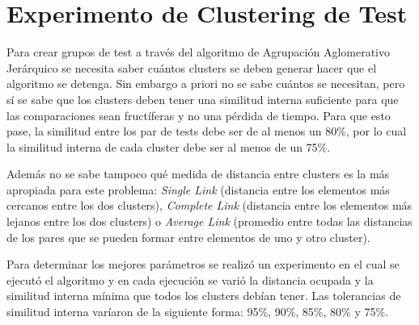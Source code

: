 \chapter{Experimento de Clustering de Test}


\par Para crear grupos de test a través del algoritmo de Agrupación Aglomerativo Jerárquico se necesita saber cuántos clusters se deben generar hacer que el algoritmo se detenga. Sin embargo a priori no se sabe cuántos se necesitan, pero sí se sabe que los clusters deben tener una similitud interna suficiente para que las comparaciones sean fructíferas y no una pérdida de tiempo. Para que esto pase, la similitud entre los par de tests debe ser de al menos un 80\%, por lo cual la similitud interna de cada cluster debe ser al menos de un 75\%. 
\par Además no se sabe tampoco qué medida de distancia entre clusters es la más apropiada para este problema: \emph{Single Link} (distancia entre los elementos más cercanos entre los dos clusters), \emph{Complete Link} (distancia entre los elementos más lejanos entre los dos clusters) o \emph{Average Link} (promedio entre todas las distancias de los pares que se pueden formar entre elementos de uno y otro cluster).  

\par Para determinar los mejores parámetros se realizó un experimento en el cual se ejecutó el algoritmo y en cada ejecución se varió la distancia ocupada y la similitud interna mínima que todos los clusters debían tener. Las tolerancias de similitud interna varíaron de la siguiente forma: 95\%, 90\%, 85\%, 80\% y 75\%.

